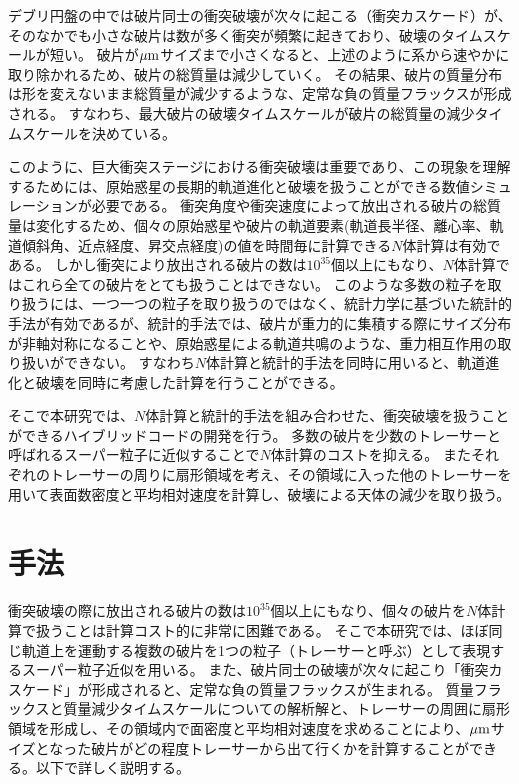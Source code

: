 \documentclass[a4paper,10pt,oneside,twocolumn,notitlepage,final]{jarticle}
\begin{document}
デブリ円盤の中では破片同士の衝突破壊が次々に起こる（衝突カスケード）が、そのなかでも小さな破片は数が多く衝突が頻繁に起きており、破壊のタイムスケールが短い。
破片が$\mu {\rm m}$サイズまで小さくなると、上述のように系から速やかに取り除かれるため、破片の総質量は減少していく。
その結果、破片の質量分布は形を変えないまま総質量が減少するような、定常な負の質量フラックスが形成される\citep[e.g.,][]{Tanaka1996}。
すなわち、最大破片の破壊タイムスケールが破片の総質量の減少タイムスケールを決めている。

このように、巨大衝突ステージにおける衝突破壊は重要であり、この現象を理解するためには、原始惑星の長期的軌道進化と破壊を扱うことができる数値シミュレーションが必要である。
衝突角度や衝突速度によって放出される破片の総質量は変化するため\citep{Genda2012}、個々の原始惑星や破片の軌道要素(軌道長半径、離心率、軌道傾斜角、近点経度、昇交点経度)の値を時間毎に計算できる$N$体計算は有効である。
しかし衝突により放出される破片の数は$10^{35}$個以上にもなり、$N$体計算ではこれら全ての破片をとても扱うことはできない。
このような多数の粒子を取り扱うには、一つ一つの粒子を取り扱うのではなく、統計力学に基づいた統計的手法が有効であるが、統計的手法では、破片が重力的に集積する際にサイズ分布が非軸対称になることや、原始惑星による軌道共鳴のような、重力相互作用の取り扱いができない。
すなわち$N$体計算と統計的手法を同時に用いると、軌道進化と破壊を同時に考慮した計算を行うことができる。

そこで本研究では、$N$体計算と統計的手法を組み合わせた、衝突破壊を扱うことができるハイブリッドコードの開発を行う。
多数の破片を少数のトレーサーと呼ばれるスーパー粒子に近似することで$N$体計算のコストを抑える。
またそれぞれのトレーサーの周りに扇形領域\citep{Morishima2015}を考え、その領域に入った他のトレーサーを用いて表面数密度と平均相対速度を計算し、破壊による天体の減少\citep{Kobayashi2010}を取り扱う。

\section{手法}
衝突破壊の際に放出される破片の数は$10^{35}$個以上にもなり、個々の破片を$N$体計算で扱うことは計算コスト的に非常に困難である。
そこで本研究では、ほぼ同じ軌道上を運動する複数の破片を1つの粒子（トレーサーと呼ぶ）として表現するスーパー粒子近似を用いる。
また、破片同士の破壊が次々に起こり「衝突カスケード」が形成されると、定常な負の質量フラックスが生まれる\citep[e.g.,][]{Tanaka1996}。
質量フラックスと質量減少タイムスケールについての解析解\citep{Kobayashi2010}と、トレーサーの周囲に扇形領域\citep{Morishima2015}を形成し、その領域内で面密度と平均相対速度を求めることにより、$\mu {\rm m}$サイズとなった破片がどの程度トレーサーから出て行くかを計算することができる。以下で詳しく説明する。
\end{document}

